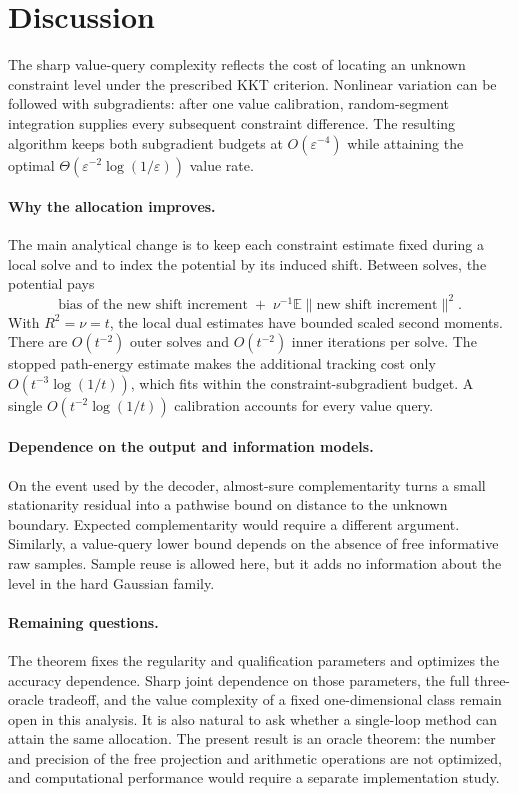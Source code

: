\documentclass[11pt,a4paper]{article}
\newcommand{\E}{\mathbb E}
\newcommand{\eps}{\varepsilon}
\theoremstyle{remark}
\numberwithin{equation}{section}
\begin{document}
\section{Discussion}\label{sec:discussion}
The sharp value-query complexity reflects the cost of locating an unknown constraint level under the prescribed KKT criterion. Nonlinear variation can be followed with subgradients: after one value calibration, random-segment integration supplies every subsequent constraint difference. The resulting algorithm keeps both subgradient budgets at $O(\eps^{-4})$ while attaining the optimal $\Theta(\eps^{-2}\log(1/\eps))$ value rate.

\paragraph{Why the allocation improves.}
The main analytical change is to keep each constraint estimate fixed during a local solve and to index the potential by its induced shift. Between solves, the potential pays
\[
 \text{bias of the new shift increment}
 \; +\;\nu^{-1}\E\|\text{new shift increment}\|^2.
\]
With $R^2=\nu=t$, the local dual estimates have bounded scaled second moments. There are $O(t^{-2})$ outer solves and $O(t^{-2})$ inner iterations per solve. The stopped path-energy estimate makes the additional tracking cost only $O(t^{-3}\log(1/t))$, which fits within the constraint-subgradient budget. A single $O(t^{-2}\log(1/t))$ calibration accounts for every value query.

\paragraph{Dependence on the output and information models.}
On the event used by the decoder, almost-sure complementarity turns a small stationarity residual into a pathwise bound on distance to the unknown boundary. Expected complementarity would require a different argument. Similarly, a value-query lower bound depends on the absence of free informative raw samples. Sample reuse is allowed here, but it adds no information about the level in the hard Gaussian family.

\paragraph{Remaining questions.}
The theorem fixes the regularity and qualification parameters and optimizes the accuracy dependence. Sharp joint dependence on those parameters, the full three-oracle tradeoff, and the value complexity of a fixed one-dimensional class remain open in this analysis. It is also natural to ask whether a single-loop method can attain the same allocation. The present result is an oracle theorem: the number and precision of the free projection and arithmetic operations are not optimized, and computational performance would require a separate implementation study.
\end{document}

